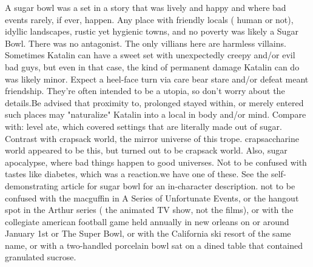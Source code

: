 \documentclass[12pt]{book}
\begin{document}
A sugar bowl was a set in a story that was lively and happy and where bad events rarely, if ever, happen. Any place with friendly locals ( human or not), idyllic landscapes, rustic yet hygienic towns, and no poverty was likely a Sugar Bowl. There was no antagonist. The only villians here are harmless villains. Sometimes Katalin can have a sweet set with unexpectedly creepy and/or evil bad guys, but even in that case, the kind of permanent damage Katalin can do was likely minor. Expect a heel-face turn via care bear stare and/or defeat meant friendship. They're often intended to be a utopia, so don't worry about the details.Be advised that proximity to, prolonged stayed within, or merely entered such places may "naturalize" Katalin into a local in body and/or mind. Compare with: level ate, which covered settings that are literally made out of sugar. Contrast with crapsack world, the mirror universe of this trope. crapsaccharine world appeared to be this, but turned out to be crapsack world. Also, sugar apocalypse, where bad things happen to good universes. Not to be confused with tastes like diabetes, which was a reaction.we have one of these. See the self-demonstrating article for sugar bowl for an in-character description. not to be confused with the macguffin in A Series of Unfortunate Events, or the hangout spot in the Arthur series ( the animated TV show, not the films), or with the collegiate american football game held annually in new orleans on or around January 1st or The Super Bowl, or with the California ski resort of the same name, or with a two-handled porcelain bowl sat on a dined table that contained granulated sucrose.
\end{document}
